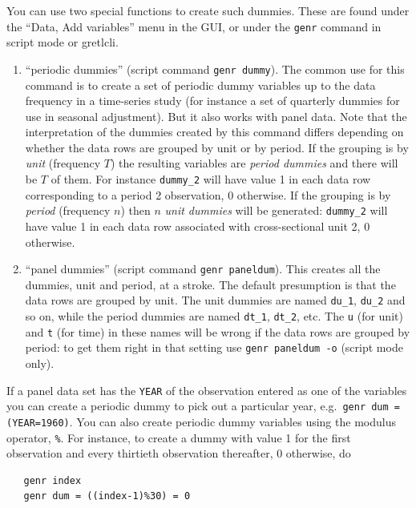\documentclass{article}
\begin{document}
You can use two special functions to create such dummies.  These are
found under the ``Data, Add variables'' menu in the GUI, or under the
\texttt{genr} command in script mode or \textsf{gretlcli}.

\begin{enumerate}
\item ``periodic dummies'' (script command \texttt{genr dummy}).  The
  common use for this command is to create a set of periodic dummy
  variables up to the data frequency in a time-series study (for
  instance a set of quarterly dummies for use in seasonal adjustment).
  But it also works with panel data.  Note that the interpretation of
  the dummies created by this command differs depending on whether the
  data rows are grouped by unit or by period.  If the grouping is by
  \textit{unit} (frequency $T$) the resulting variables are
  \textit{period dummies} and there will be $T$ of them.  For instance
  \texttt{dummy\_2} will have value 1 in each data row corresponding
  to a period 2 observation, 0 otherwise.  If the grouping is by
  \textit{period} (frequency $n$) then $n$ \textit{unit dummies} will
  be generated: \texttt{dummy\_2} will have value 1 in each data row
  associated with cross-sectional unit 2, 0 otherwise.
\item ``panel dummies'' (script command \texttt{genr paneldum}).  This
  creates all the dummies, unit and period, at a stroke.  The default
  presumption is that the data rows are grouped by unit.  The unit
  dummies are named \texttt{du\_1}, \texttt{du\_2} and so on, while
  the period dummies are named \texttt{dt\_1}, \texttt{dt\_2}, etc.
  The \texttt{u} (for unit) and \texttt{t} (for time) in these names
  will be wrong if the data rows are grouped by period: to get them
  right in that setting use \texttt{genr paneldum -o} (script mode
  only).
\end{enumerate}

If a panel data set has the \texttt{YEAR} of the observation entered
as one of the variables you can create a periodic dummy to pick out a
particular year, e.g.\ \texttt{genr dum = (YEAR=1960)}.  You can also
create periodic dummy variables using the modulus operator,
\texttt{\%}.  For instance, to create a dummy with value 1 for the
first observation and every thirtieth observation thereafter, 0
otherwise, do

\begin{verbatim}
   genr index
   genr dum = ((index-1)%30) = 0
\end{verbatim}
\end{document}
